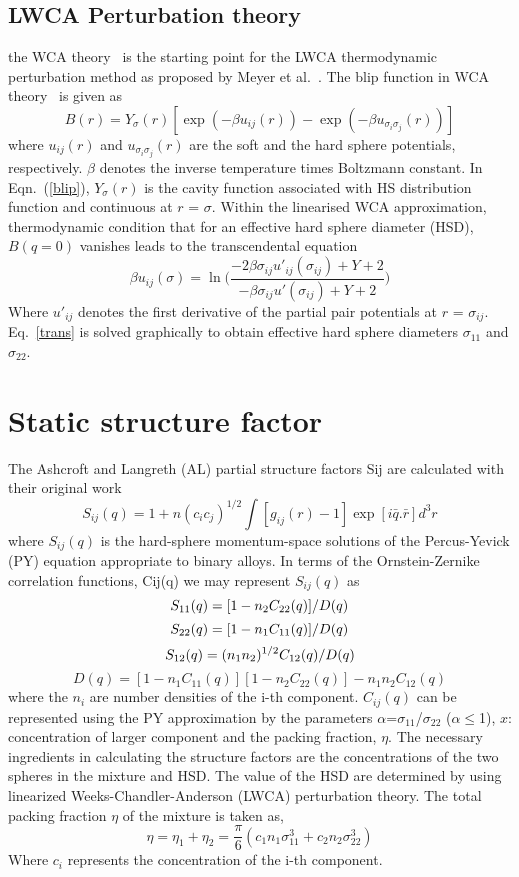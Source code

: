 \documentclass[final12pt]{elsarticle}
\newcommand{\be}{\begin{equation}}
\newcommand{\ee}{\end{equation}}
\begin{document}
\subsection{LWCA Perturbation theory}
the WCA theory~\cite{Week1971} is the starting point for the LWCA thermodynamic perturbation method as proposed by Meyer et al.~\cite{Mayer1980}. The blip function in WCA theory~\cite{Week1971} is given as
\be
\label{blip}
B(r)=Y_{\sigma}(r)[\exp(-\beta u_{ij}(r))-\exp(-\beta u_{\sigma_i\sigma_j}(r))]
\ee
where $u_{ij}(r)$ and $u_{\sigma_i\sigma_j}(r)$ are the soft and the hard sphere potentials, respectively. $\beta$ denotes the inverse temperature times Boltzmann constant. In Eqn.~(\ref{blip}), $Y_{\sigma}(r)$ is the cavity function associated with HS distribution function and continuous at $r$ = $\sigma$. Within the linearised WCA approximation, thermodynamic condition that for an effective hard sphere diameter (HSD), $B(q = 0)$ vanishes leads to the transcendental equation
\be
\label{trans}
\beta u_{ij}(\sigma)=\ln\Bigg(\frac{-2\beta\sigma_{ij} u'_{ij}(\sigma_{ij})+Y+2}{-\beta\sigma_{ij} u'(\sigma_{ij})+Y+2}\Bigg)
\ee
Where $u'_{ij}$ denotes the first derivative of the partial pair potentials at $r$ = $\sigma_{ij}$.
Eq.~\ref{trans} is solved graphically to obtain effective hard sphere diameters $\sigma_{11}$ and $\sigma_{22}$.

\section{Static structure factor}
The Ashcroft and Langreth (AL) partial structure factors Sij are calculated with their original work~\cite{LAshcroft1967} 
\be
S_{ij}(q)=1+n {(c_i c_j)}^{1/2} \int[g_{ij}(r)-1]\exp [i\bar q.\bar r]d^{3}r
\ee
where $S_{ij}(q)$ is the hard-sphere momentum-space solutions of the Percus-Yevick (PY) equation appropriate to binary alloys. In terms of the Ornstein-Zernike correlation functions, Cij(q) we may represent $S_{ij}(q)$ as
\be
S_{11}(q) = [1 - n_2C_{22}(q)]/D(q)\\
\ee
\be
S_{22}(q) = [1 - n_1C_{11}(q)]/D(q) \\
\ee
\be
S_{12}(q) = (n_1n_2)^{1/2}C_{12}(q)/D(q)\\ 
\ee
\be
D(q) = [1 - n_1C_{11}(q)][1 - n_2C_{22}(q)] - n_1n_2C_{12}(q)
\ee
where the $n_i$ are number densities of the i-th component. $C_{ij}(q)$ can be represented using the PY approximation by the parameters $\alpha$=$\sigma_{11}$/$\sigma_{22}$ ($\alpha\leq$1), $x$: concentration of larger component and the packing fraction, $\eta$.
The necessary ingredients in calculating the structure factors are the concentrations of the two spheres in the mixture and HSD. The value of the HSD are determined by using linearized Weeks-Chandler-Anderson (LWCA) perturbation theory. The total packing fraction $\eta$ of the mixture is taken as, 
\be
\eta = \eta_1 + \eta_2 = \frac{\pi}{6}(c_1n_1\sigma_{11}^3+c_2n_2\sigma_{22}^3)
\ee
Where $c_i$ represents the concentration of the i-th component.
\end{document}
